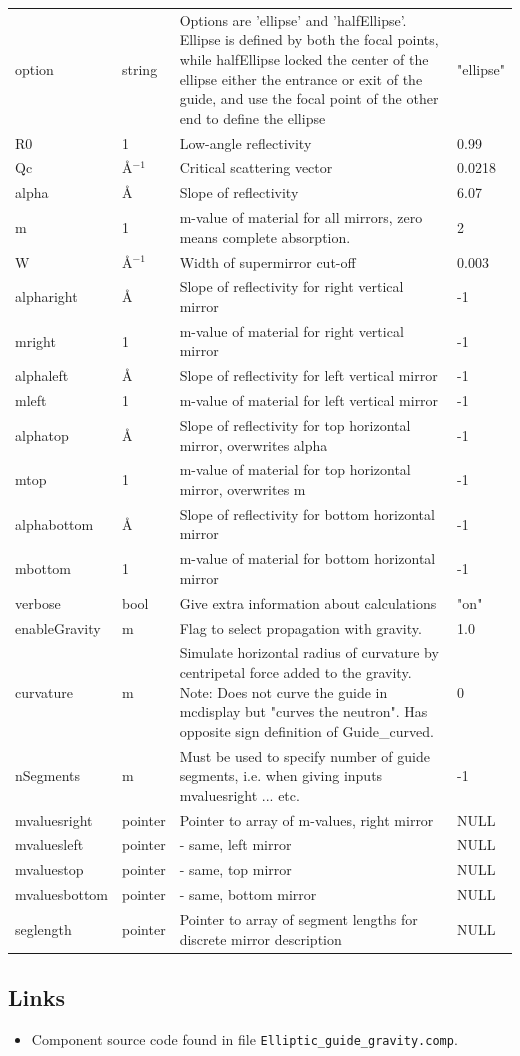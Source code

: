 \begin{longtable}{p{}p{}p{}p{}}
option & string & Options are 'ellipse' and 'halfEllipse'. Ellipse is defined by both the focal points, while halfEllipse locked the center of the ellipse either the entrance or exit of the guide, and use the focal point of the other end to define the ellipse & "ellipse" \\
R0 & 1 & Low-angle reflectivity & 0.99 \\
Qc & \AA{}$^{-1}$ & Critical scattering vector & 0.0218 \\
alpha & \AA{} & Slope of reflectivity & 6.07 \\
m & 1 & m-value of material for all mirrors, zero means complete absorption. & 2 \\
W & \AA{}$^{-1}$ & Width of supermirror cut-off & 0.003 \\
alpharight & \AA{} & Slope of reflectivity for right vertical mirror & -1 \\
mright & 1 & m-value of material for right vertical mirror & -1 \\
alphaleft & \AA{} & Slope of reflectivity for left vertical mirror & -1 \\
mleft & 1 & m-value of material for left vertical mirror & -1 \\
alphatop & \AA{} & Slope of reflectivity for top horizontal mirror, overwrites alpha & -1 \\
mtop & 1 & m-value of material for top horizontal mirror, overwrites m & -1 \\
alphabottom & \AA{} & Slope of reflectivity for bottom horizontal mirror & -1 \\
mbottom & 1 & m-value of material for bottom horizontal mirror & -1 \\
verbose & bool & Give extra information about calculations & "on" \\
enableGravity & m & Flag to select propagation with gravity. & 1.0 \\
curvature & m & Simulate horizontal radius of curvature by centripetal force added to the gravity. Note: Does not curve the guide in mcdisplay but "curves the neutron". Has opposite sign definition of Guide\_curved. & 0 \\
nSegments & m & Must be used to specify number of guide segments, i.e. when giving inputs mvaluesright ... etc. & -1 \\
mvaluesright & pointer & Pointer to array of m-values, right mirror & NULL \\
mvaluesleft & pointer & - same, left mirror & NULL \\
mvaluestop & pointer & - same, top mirror & NULL \\
mvaluesbottom & pointer & - same, bottom mirror & NULL \\
seglength & pointer & Pointer to array of segment lengths for discrete mirror description & NULL \\
\bottomrule
\end{longtable}

\subsection*{Links}
\begin{itemize}
  \item Component source code found in file \texttt{Elliptic\_guide\_gravity.comp}.
\end{itemize}
